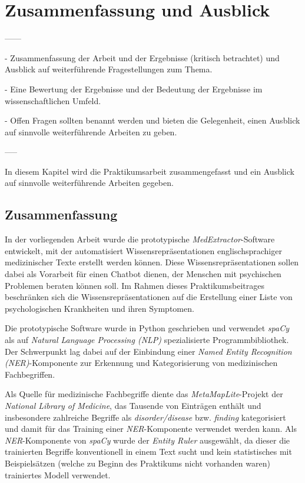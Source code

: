 \chapter{Zusammenfassung und Ausblick}
\label{ch:zusammenfassung}


------

- Zusammenfassung der Arbeit und der Ergebnisse (kritisch betrachtet) und Ausblick auf weiterführende Fragestellungen zum Thema.


- Eine Bewertung der Ergebnisse und der Bedeutung der Ergebnisse im wissenschaftlichen Umfeld.


- Offen Fragen sollten benannt werden und bieten die Gelegenheit, einen Ausblick auf sinnvolle weiterführende Arbeiten zu geben.

-----

In diesem Kapitel wird die Praktikumsarbeit zusammengefasst und ein Ausblick auf sinnvolle weiterführende Arbeiten gegeben.




\section{Zusammenfassung}
\label{sec:Zusammenfassung} 

In der vorliegenden Arbeit wurde die prototypische \emph{MedExtractor}-Software entwickelt, mit der automatisiert Wissensrepräsentationen englischsprachiger medizinischer Texte erstellt werden können. Diese Wissensrepräsentationen sollen dabei als Vorarbeit für einen Chatbot dienen, der Menschen mit psychischen Problemen beraten können soll. Im Rahmen dieses Praktikumsbeitrages beschränken sich die Wissensrepräsentationen auf die Erstellung einer Liste von psychologischen Krankheiten und ihren Symptomen. 

Die prototypische Software wurde in Python geschrieben und verwendet \emph{spaCy} als  auf \emph{Natural Language Processing (NLP)} spezialisierte Programmbibliothek. Der Schwerpunkt lag dabei auf der Einbindung einer \emph{Named Entity Recognition (NER)}-Komponente zur Erkennung und Kategorisierung von medizinischen Fachbegriffen.

Als Quelle für medizinische Fachbegriffe diente das \emph{MetaMapLite}-Projekt der \emph{National Library of Medicine}, das Tausende von Einträgen enthält und insbesondere zahlreiche Begriffe als \emph{disorder/disease} bzw. \emph{finding} kategorisiert und damit für das Training einer \emph{NER}-Komponente verwendet werden kann. Als \emph{NER}-Komponente von \emph{spaCy} wurde der \emph{Entity Ruler} ausgewählt, da dieser die trainierten Begriffe konventionell in einem Text sucht und kein statistisches mit Beispielsätzen (welche zu Beginn des Praktikums nicht vorhanden waren) trainiertes Modell verwendet.

